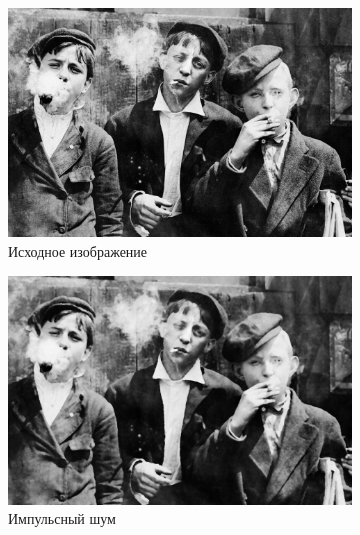 \begin{figure}[ht!] 
    \centering
    \begin{subfigure}[b]{0.5\linewidth}
        \centering
        \includegraphics[width=0.95\linewidth]{../lewis-hine-taschen-main-3.jpg} 
        \caption{Исходное изображение} 
        \label{rang_5_14:a} 
        \vspace{4ex}
    \end{subfigure}%
    \begin{subfigure}[b]{0.5\linewidth}
      \centering
      \includegraphics[width=0.95\linewidth]{../Rang_Filter/Rang_Impulse_noise_(k=5,r=14).jpg} 
      \caption{Импульсный шум} 
      \label{rang_5_14:b} 
      \vspace{4ex}
    \end{subfigure}
    \begin{subfigure}[b]{0.5\linewidth}
      \centering

\end{subfigure}
\end{figure}
